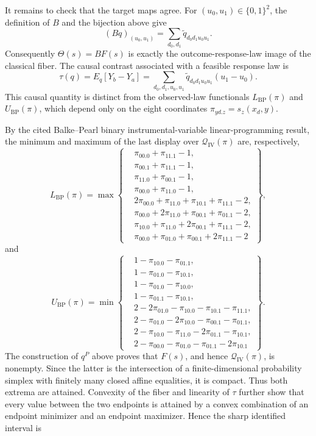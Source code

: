 It remains to check that the target maps agree. For \((u_0,u_1)\in\{0,1\}^2\), the definition of \(B\) and the bijection above give
\[
(Bq)_{(u_0,u_1)}
=\sum_{d_0,d_1}\widetilde q_{d_0d_1u_0u_1}.
\]
Consequently \(\Theta(s)=BF(s)\) is exactly the outcome-response-law image of the classical fiber. The causal contrast associated with a feasible response law is
\[
\tau(q)=E_q[Y_b-Y_a]
=\sum_{d_0,d_1,u_0,u_1}
 \widetilde q_{d_0d_1u_0u_1}(u_1-u_0).
\]
This causal quantity is distinct from the observed-law functionals \(L_{\mathrm{BP}}(\pi)\) and \(U_{\mathrm{BP}}(\pi)\), which depend only on the eight coordinates \(\pi_{yd.z}=s_z(x_d,y)\).

By the cited Balke--Pearl binary instrumental-variable linear-programming result, the minimum and maximum of the last display over \(\mathcal Q_{\mathrm{IV}}(\pi)\) are, respectively,
\[
L_{\mathrm{BP}}(\pi)=\max\left\{
\begin{aligned}
&\pi_{00.0}+\pi_{11.1}-1,\\
&\pi_{00.1}+\pi_{11.1}-1,\\
&\pi_{11.0}+\pi_{00.1}-1,\\
&\pi_{00.0}+\pi_{11.0}-1,\\
&2\pi_{00.0}+\pi_{11.0}+\pi_{10.1}+\pi_{11.1}-2,\\
&\pi_{00.0}+2\pi_{11.0}+\pi_{00.1}+\pi_{01.1}-2,\\
&\pi_{10.0}+\pi_{11.0}+2\pi_{00.1}+\pi_{11.1}-2,\\
&\pi_{00.0}+\pi_{01.0}+\pi_{00.1}+2\pi_{11.1}-2
\end{aligned}\right\},
\]
and
\[
U_{\mathrm{BP}}(\pi)=\min\left\{
\begin{aligned}
&1-\pi_{10.0}-\pi_{01.1},\\
&1-\pi_{01.0}-\pi_{10.1},\\
&1-\pi_{01.0}-\pi_{10.0},\\
&1-\pi_{01.1}-\pi_{10.1},\\
&2-2\pi_{01.0}-\pi_{10.0}-\pi_{10.1}-\pi_{11.1},\\
&2-\pi_{01.0}-2\pi_{10.0}-\pi_{00.1}-\pi_{01.1},\\
&2-\pi_{10.0}-\pi_{11.0}-2\pi_{01.1}-\pi_{10.1},\\
&2-\pi_{00.0}-\pi_{01.0}-\pi_{01.1}-2\pi_{10.1}
\end{aligned}\right\}.
\]
The construction of \(q^P\) above proves that \(F(s)\), and hence \(\mathcal Q_{\mathrm{IV}}(\pi)\), is nonempty. Since the latter is the intersection of a finite-dimensional probability simplex with finitely many closed affine equalities, it is compact. Thus both extrema are attained. Convexity of the fiber and linearity of \(\tau\) further show that every value between the two endpoints is attained by a convex combination of an endpoint minimizer and an endpoint maximizer. Hence the sharp identified interval is
